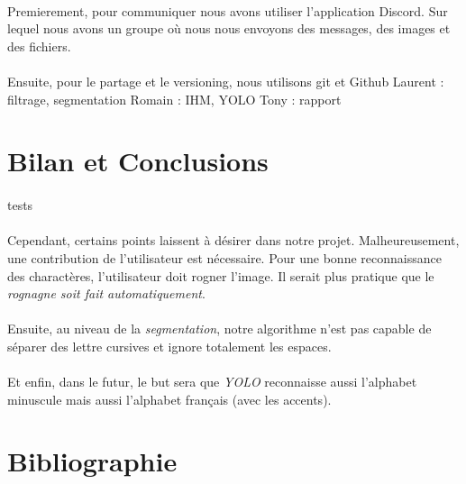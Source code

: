 \documentclass[a4paper]{article}
\begin{document}
		\paragraph{} Premierement, pour communiquer nous avons utiliser l'application Discord. Sur lequel nous avons un groupe où nous nous envoyons des messages, des images et des fichiers.
		\paragraph{} Ensuite, pour le partage et le versioning, nous utilisons git et Github
		Laurent : filtrage, segmentation
		Romain : IHM, YOLO
		Tony : rapport
	\section*{Bilan et Conclusions}%
		\paragraph{}
			tests
		\paragraph{}
			Cependant, certains points laissent à désirer dans notre projet. Malheureusement, une contribution de l'utilisateur est nécessaire. Pour une bonne reconnaissance des charactères, l'utilisateur doit rogner l'image. Il serait plus pratique que le \emph{rognagne soit fait automatiquement}. 
		\paragraph{}
			Ensuite, au niveau de la \emph{segmentation}, notre algorithme n'est pas capable de séparer des lettre cursives et ignore totalement les espaces.
		\paragraph{}
			Et enfin, dans le futur, le but sera que \emph{YOLO} reconnaisse aussi l'alphabet minuscule mais aussi l'alphabet français (avec les accents).
	\newpage
	\section*{Bibliographie}
	\newpage
\end{document}
